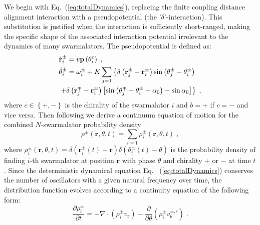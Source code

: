 \documentclass{article}
\begin{document}
We begin with Eq.~(\ref{eq:totalDynamics}), replacing the finite coupling distance alignment interaction with a pseudopotential (the '$\delta$'-interaction). This substitution is justified when the interaction is sufficiently short-ranged, making the specific shape of the associated interaction potential irrelevant to the dynamics of many swarmalators. The pseudopotential is defined as:
\begin{subequations}
    \begin{align}
        &\dot{\mathbf{r}}_{i}^{\pm}=v\mathbf{p}\left( \theta _{i}^{c} \right) \;,\\
        &\dot{\theta}_{i}^{\pm}=\omega _{i}^{\pm}+K\sum_{j=1}{\left\{ \delta \left( \mathbf{r}_{j}^{\pm}-\mathbf{r}_{i}^{\pm} \right) \sin \left( \theta _{j}^{\pm}-\theta _{i}^{\pm} \right) \right.}\notag\\
        &\left. +\delta \left( \mathbf{r}_{j}^{\mp}-\mathbf{r}_{i}^{\pm} \right) \left[ \sin \left( \theta _{j}^{\mp}-\theta _{i}^{\pm}+\alpha _0 \right) -\sin \alpha _0 \right] \right\} \;,
    \end{align}
\end{subequations}
where $c\in\left\{+,-\right\}$ is the chirality of the swarmalator $i$ and $b=+$ if $c=-$ and vice versa.  
Then following \cite{David_S_Dean_1996} we derive a continuum equation of motion for the combined $N$-swarmalator probability density
\begin{equation}
    \label{eq:globalContinuityDef}
    \rho ^{\pm}\left( \mathbf{r},\theta ,t \right) =\sum_{i=1}{\rho _{i}^{\pm}\left( \mathbf{r},\theta ,t \right)}\;,
\end{equation}
where $\rho _{i}^{\pm}\left( \mathbf{r},\theta ,t \right) =\delta \left( \mathbf{r}_{i}^{\pm}\left( t \right) -\mathbf{r} \right) \delta \left( \theta _{i}^{\pm}\left( t \right) -\theta \right)$ is the probability density of finding $i$-th swarmalator at position $\mathbf{r}$ with phase $\theta$ and chirality $+$ or $-$ at time $t$.
Since the deterministic dynamical equation Eq.~ (\ref{eq:totalDynamics}) conserves the number of oscillators with a given natural frequency over time, the distribution function evolves according to a continuity equation of the following form:
\begin{equation}
    \frac{\partial \rho _{i}^{\pm}}{\partial t}=-\nabla \cdot \left( \rho _{i}^{\pm}v_{\mathbf{r}} \right) -\frac{\partial}{\partial \theta}\left( \rho _{i}^{\pm}v_{\theta}^{\pm ,i} \right) \;.
    \label{eq:singleContinuity}
\end{equation}
\end{document}
